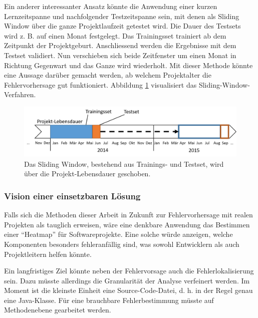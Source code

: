 \documentclass[10pt, a4paper]{article}
\begin{document}
Ein anderer interessanter Ansatz könnte die Anwendung einer kurzen Lernzeitspanne und nachfolgender Testzeitspanne sein, mit denen als Sliding Window über die ganze Projektlaufzeit getestet wird. Die Dauer des Testsets wird z. B. auf einen Monat festgelegt. Das Trainingsset trainiert ab dem Zeitpunkt der Projektgeburt. Anschliessend werden die Ergebnisse mit dem Testset validiert. Nun verschieben sich beide Zeitfenster um einen Monat in Richtung Gegenwart und das Ganze wird wiederholt. Mit dieser Methode könnte eine Aussage darüber gemacht werden, ab welchem Projektalter die Fehlervorhersage gut funktioniert. Abbildung \ref{fig:sliding_window} visualisiert das Sliding-Window-Verfahren.

\begin{figure}[!ht]
	\centering
	\includegraphics[width=1\textwidth]{resources/images/sliding_window_experiment.png}
	\caption[Visualisierung eines Sliding-Window-Experiments]{Das Sliding Window, bestehend aus Trainings- und Testset, wird über die Projekt-Lebensdauer geschoben.}
	\label{fig:sliding_window}
\end{figure}





\subsubsection{Vision einer einsetzbaren Lösung}

Falls sich die Methoden dieser Arbeit in Zukunft zur Fehlervorhersage mit realen Projekten als tauglich erweisen, wäre eine denkbare Anwendung das Bestimmen einer ``Heatmap'' für Softwareprojekte. Eine solche würde anzeigen, welche Komponenten besonders fehleranfällig sind, was sowohl Entwicklern als auch Projektleitern helfen könnte. 

Ein langfristiges Ziel könnte neben der Fehlervorsage auch die Fehlerlokalisierung sein. Dazu müsste allerdings die Granularität der Analyse verfeinert werden. Im Moment ist die kleinste Einheit eine Source-Code-Datei, d. h. in der Regel genau eine Java-Klasse. Für eine brauchbare Fehlerbestimmung müsste auf Methodenebene gearbeitet werden.
\end{document}
